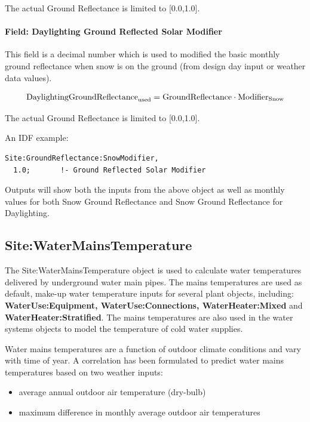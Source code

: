 The actual Ground Reflectance is limited to {[}0.0,1.0{]}.

\paragraph{Field: Daylighting Ground Reflected Solar Modifier}\label{field-daylighting-ground-reflected-solar-modifier}

This field is a decimal number which is used to modified the basic monthly ground reflectance when snow is on the ground (from design day input or weather data values).

\begin{equation}
\rm{DaylightingGroundReflectance}_{\rm{used}} = \rm{GroundReflectance} \cdot \rm{Modifier}_{\rm{Snow}}
\end{equation}

The actual Ground Reflectance is limited to {[}0.0,1.0{]}.

An IDF example:

\begin{lstlisting}
Site:GroundReflectance:SnowModifier,
  1.0;       !- Ground Reflected Solar Modifier
\end{lstlisting}

Outputs will show both the inputs from the above object as well as monthly values for both Snow Ground Reflectance and Snow Ground Reflectance for Daylighting.

\subsection{Site:WaterMainsTemperature}\label{sitewatermainstemperature}

The Site:WaterMainsTemperature object is used to calculate water temperatures delivered by underground water main pipes. The mains temperatures are used as default, make-up water temperature inputs for several plant objects, including: \textbf{WaterUse:Equipment, WaterUse:Connections, WaterHeater:Mixed} and \textbf{WaterHeater:Stratified}. The mains temperatures are also used in the water systems objects to model the temperature of cold water supplies.

Water mains temperatures are a function of outdoor climate conditions and vary with time of year. A correlation has been formulated to predict water mains temperatures based on two weather inputs:

\begin{itemize}
\item
  average annual outdoor air temperature (dry-bulb)
\item
  maximum difference in monthly average outdoor air temperatures
\end{itemize}

